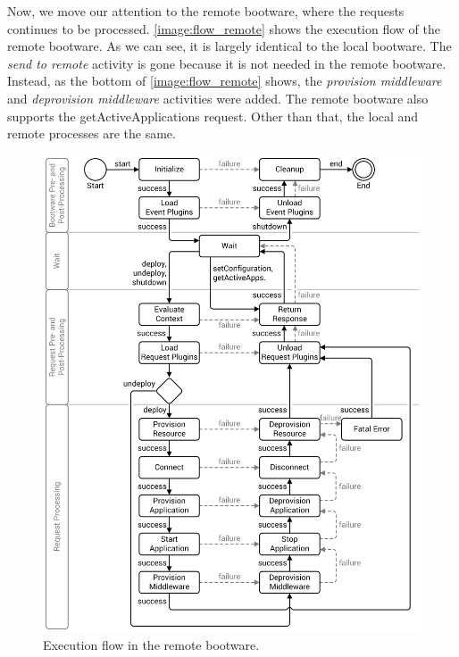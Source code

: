 Now, we move our attention to the remote bootware, where the requests continues to be processed.
\autoref{image:flow_remote} shows the execution flow of the remote bootware.
As we can see, it is largely identical to the local bootware.
The \textit{send to remote} activity is gone because it is not needed in the remote bootware.
Instead, as the bottom of \autoref{image:flow_remote} shows, the \textit{provision middleware} and \textit{deprovision middleware} activities were added.
The remote bootware also supports the getActiveApplications request.
Other than that, the local and remote processes are the same.

\begin{figure}[!htbp]
	\centering
	\includegraphics[resolution=600]{design/assets/flow_remote}
	\caption{Execution flow in the remote bootware.}
	\label{image:flow_remote}
\end{figure}

